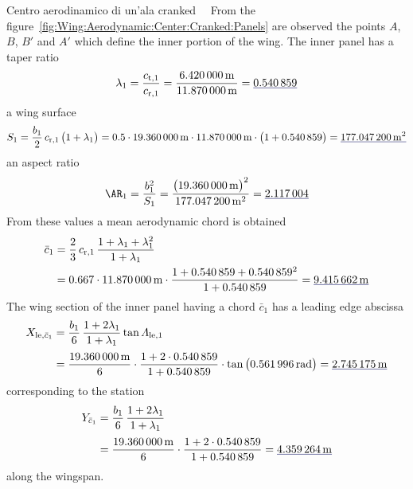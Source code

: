 \documentclass[[12pt,twoside]{book}
\begin{document}
\begin{myExampleX}{Centro aerodinamico di un'ala cranked}{\ \myIconGraph\ }
From the figure~\ref{fig:Wing:Aerodynamic:Center:Cranked:Panels} are observed
the points $A$, $B$, $B'$ and $A'$ which define the inner portion of the wing.
The inner panel has a taper ratio
\[
\lambda_1
  =\frac{c_{\mathrm{t},1}}{c_{\mathrm{r},1}}
  =\frac{\SI[round-precision=2]{\myChordTipWingIMT}{\metre}}{\SI[round-precision=2]{\myChordRootWingIMT}{\metre}}
  =\mathunderline{mydarkblue}{ \SI[round-precision=2]{\myTaperRatioWingI}{} }
\]
a wing surface
\[
S_1 = \frac{b_1}{2} \, c_{\mathrm{r},1} \, \big( 1 + \lambda_1 \big)
  =
    \num{0.5} \cdot \SI[round-precision=1]{\mySpanWingIMT}{\metre}
      \cdot \SI[round-precision=2]{\myChordRootWingIMT}{\metre}
      \cdot \big( 1 + \SI[round-precision=2]{\myTaperRatioWingI}{} \big) 
    = \mathunderline{mydarkblue}{ \SI[round-precision=1]{\myAreaWingIMTsquared}{\metre^2} }
\]
an aspect ratio
\[
\AR_1 
  = \frac{b_1^2}{S_1}
  = \frac{\big(\SI[round-precision=1]{\mySpanWingIMT}{\metre}\big)^2}{\SI[round-precision=1]{\myAreaWingIMTsquared}{\metre^2}}
  = \mathunderline{mydarkblue}{ \num[round-precision=2]{\myAspectRatioWingI} }
\]
From these values a mean aerodynamic chord is obtained
\[
\begin{split}
\bar{c}_1 & {}= \frac{2}{3} \, c_{\mathrm{r},1} \, \frac{1+\lambda_1 + \lambda_1^2}{1+\lambda_1} \\
  & {}=
    \num{0.667} \cdot \SI[round-precision=2]{\myChordRootWingIMT}{\metre}
      \cdot 
        \frac{
          1 + \SI[round-precision=2]{\myTaperRatioWingI}{} + \SI[round-precision=2]{\myTaperRatioWingI}{}^2
        }{
          1 + \SI[round-precision=2]{\myTaperRatioWingI}{}
        }
    = \mathunderline{mydarkblue}{ \SI[round-precision=2]{\myMACWingIMT}{\metre} }
\end{split}
\]
The wing section of the inner panel having a chord $\bar{c}_1$ has a leading edge
abscissa
\[
\begin{split}
X_{\mathrm{le},\bar{c}_1} 
  & {}=
    \frac{b_1}{6} \, \frac{1+2\lambda_1}{1+\lambda_1} \tan\Lambda_\mathrm{le,1} \\[3pt]
  & {}=
    \frac{\SI[round-precision=1]{\mySpanWingIMT}{\metre}}{6}
      \cdot 
      \frac{
        1 + 2\cdot\SI[round-precision=2]{\myTaperRatioWingI}{}
      }{
        1 + \SI[round-precision=2]{\myTaperRatioWingI}{}
      }
      \cdot \tan \big( \SI[round-precision=3]{\mySweepLEWingIRAD}{\radian} \big)
    = \mathunderline{mydarkblue}{ \SI[round-precision=2]{\myXMACLEToApexWingIMT}{\metre} }
\end{split}
\]
corresponding to the station
\[
\begin{split}
Y_{\bar{c}_1} 
  & {}=
    \frac{b_1}{6} \, \frac{1+2\lambda_1}{1+\lambda_1} \\[3pt]
  & {}=
    \frac{\SI[round-precision=1]{\mySpanWingIMT}{\metre}}{6}
      \cdot 
      \frac{
        1 + 2\cdot\SI[round-precision=2]{\myTaperRatioWingI}{}
      }{
        1 + \SI[round-precision=2]{\myTaperRatioWingI}{}
      }
    = \mathunderline{mydarkblue}{ \SI[round-precision=2]{\myYMACWingIMT}{\metre} }
\end{split}
\]
along the wingspan.


\end{myExampleX}
\end{document}
